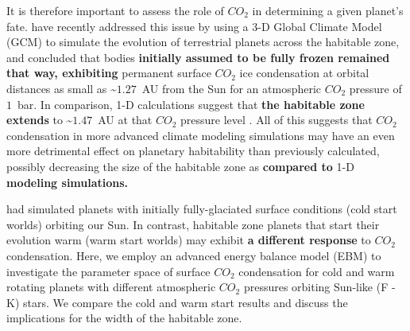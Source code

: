 \documentclass[fleqn,usenatbib]{mnras}
\providecommand{\DIFadd}[1]{{\bf #1}} %
\providecommand{\DIFdel}[1]{} %
\providecommand{\DIFaddbegin}{} %
\providecommand{\DIFaddend}{} %
\providecommand{\DIFdelbegin}{} %
\providecommand{\DIFdelend}{} %
\newcommand{\DIFscaledelfig}{0.5}
\newlength{\DIFdelgraphicswidth} %
\newlength{\DIFdelgraphicsheight} %
\newcommand{\DIFaddincludegraphics}[2][]{{\color{blue}\fbox{\DIFOincludegraphics[#1]{#2}}}} %
\newcommand{\DIFdelincludegraphics}[2][]{%
\sbox{\DIFdelgraphicsbox}{\DIFOincludegraphics[#1]{#2}}%
\settoboxwidth{\DIFdelgraphicswidth}{\DIFdelgraphicsbox} %
\settoboxtotalheight{\DIFdelgraphicsheight}{\DIFdelgraphicsbox} %
\scalebox{\DIFscaledelfig}{%
\parbox[b]{\DIFdelgraphicswidth}{\usebox{\DIFdelgraphicsbox}\\[-\baselineskip] \rule{\DIFdelgraphicswidth}{0em}}\llap{\resizebox{\DIFdelgraphicswidth}{\DIFdelgraphicsheight}{%
\setlength{\unitlength}{\DIFdelgraphicswidth}%
\begin{picture}(1,1)%
\thicklines\linethickness{2pt} %
{\color[rgb]{1,0,0}\put(0,0){\framebox(1,1){}}}%
{\color[rgb]{1,0,0}\put(0,0){\line( 1,1){1}}}%
{\color[rgb]{1,0,0}\put(0,1){\line(1,-1){1}}}%
\end{picture}%
}\hspace*{3pt}}} %
} %
\DeclareRobustCommand{\DIFaddbegin}{\DIFOaddbegin \let\includegraphics\DIFaddincludegraphics} %
\DeclareRobustCommand{\DIFaddend}{\DIFOaddend \let\includegraphics\DIFOincludegraphics} %
\DeclareRobustCommand{\DIFdelbegin}{\DIFOdelbegin \let\includegraphics\DIFdelincludegraphics} %
\DeclareRobustCommand{\DIFdelend}{\DIFOaddend \let\includegraphics\DIFOincludegraphics} %
\begin{document}
It is therefore important to assess the role of $CO_{\mathrm{2}}$ in determining a given planet's fate. \citet{Turbet2017} have recently addressed this issue by using a 3-D Global Climate Model (GCM) to simulate the evolution of terrestrial planets across the habitable zone, and concluded that bodies \DIFdelbegin \DIFdel{remained fully frozen and exhibited }\DIFdelend \DIFaddbegin \DIFadd{initially assumed to be fully frozen remained that way, exhibiting }\DIFaddend permanent surface $CO_{\mathrm{2}}$ ice condensation at orbital distances as small as \textasciitilde $1.27$~AU from the Sun for an atmospheric $CO_{\mathrm{2}}$ pressure of $1$~bar. In comparison, 1-D calculations suggest that \DIFdelbegin \DIFdel{planets can remain habitable up }\DIFdelend \DIFaddbegin \DIFadd{the habitable zone extends }\DIFaddend to \textasciitilde $1.47$~AU at that $CO_{\mathrm{2}}$ pressure level \citep{kasting1993,KumarKopparapu2013, Ramirez2018}. 
All of this suggests that $CO_{\mathrm{2}}$ condensation in more advanced climate modeling simulations may have an even more detrimental effect on planetary habitability than previously calculated, possibly decreasing the size of the habitable zone as \DIFdelbegin \DIFdel{computed in }\DIFdelend \DIFaddbegin \DIFadd{compared to }\DIFaddend 1-D \DIFdelbegin \DIFdel{models.
}\DIFdelend \DIFaddbegin \DIFadd{modeling simulations.
}\DIFaddend 

\DIFdelbegin \DIFdel{However, }\DIFdelend \citet{Turbet2017} had simulated planets with initially fully-glaciated surface conditions (cold start worlds) orbiting our Sun. In contrast, habitable zone planets that start their evolution warm (warm start worlds) may exhibit \DIFdelbegin \DIFdel{different responses }\DIFdelend \DIFaddbegin \DIFadd{a different response }\DIFaddend to $CO_{\mathrm{2}}$ condensation. Here, we employ an advanced energy balance model (EBM) to investigate the parameter space of surface $CO_{\mathrm{2}}$ condensation for cold and warm rotating planets with different atmospheric $CO_{\mathrm{2}}$ pressures orbiting Sun-like (F - K) stars. We compare the cold and warm start results and discuss the implications for the width of the habitable zone.
\end{document}
